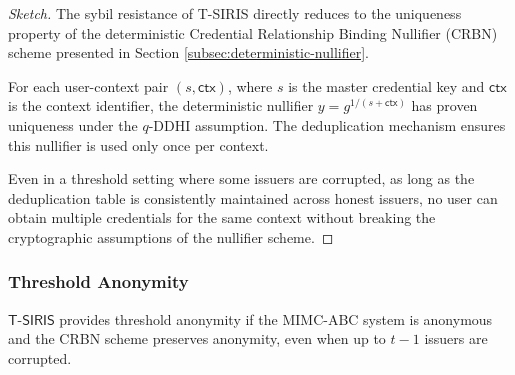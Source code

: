 \begin{proof}[Sketch]
The sybil resistance of T-SIRIS directly reduces to the uniqueness property of the deterministic Credential Relationship Binding Nullifier (CRBN) scheme presented in Section \ref{subsec:deterministic-nullifier}. 

For each user-context pair $(s, \mathsf{ctx})$, where $s$ is the master credential key and $\mathsf{ctx}$ is the context identifier, the deterministic nullifier $y = g^{1/(s + \mathsf{ctx})}$ has proven uniqueness under the $q$-DDHI assumption. The deduplication mechanism ensures this nullifier is used only once per context.

Even in a threshold setting where some issuers are corrupted, as long as the deduplication table is consistently maintained across honest issuers, no user can obtain multiple credentials for the same context without breaking the cryptographic assumptions of the nullifier scheme.
\end{proof}

\subsubsection{Threshold Anonymity}

\begin{theorem}
$\mathsf{T\text{-}SIRIS}$ provides threshold anonymity if the MIMC-ABC system is anonymous and the CRBN scheme preserves anonymity, even when up to $t-1$ issuers are corrupted.
\end{theorem}

